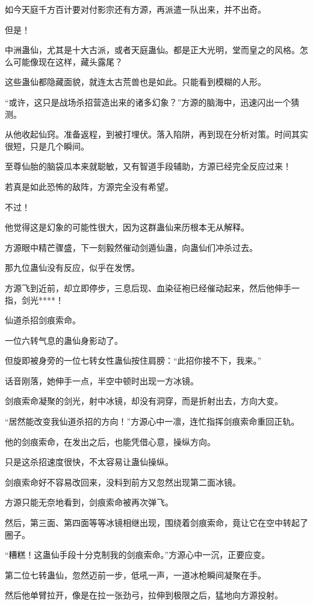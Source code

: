 \begin{this_body}
如今天庭千方百计要对付影宗还有方源，再派遣一队出来，并不出奇。

但是！

中洲蛊仙，尤其是十大古派，或者天庭蛊仙。都是正大光明，堂而皇之的风格。怎么可能像现在这样，藏头露尾？

这些蛊仙都隐藏面貌，就连太古荒兽也是如此。只能看到模糊的人形。

“或许，这只是战场杀招营造出来的诸多幻象？”方源的脑海中，迅速闪出一个猜测。

从他收起仙窍。准备返程，到被打埋伏。落入陷阱，再到现在分析对策。时间其实很短，只是几个瞬间。

至尊仙胎的脑袋瓜本来就聪敏，又有智道手段辅助，方源已经完全反应过来！

若真是如此恐怖的敌阵，方源完全没有希望。

不过！

他觉得这是幻象的可能性很大，因为这群蛊仙来历根本无从解释。

方源眼中精芒骤盛，下一刻毅然催动剑遁仙蛊，向蛊仙们冲杀过去。

那九位蛊仙没有反应，似乎在发愣。

方源飞到近前，却立即停步，三息后现、血染征袍已经催动起来，然后他伸手一指，剑光****！

仙道杀招剑痕索命。

一位六转气息的蛊仙身影动了。

但旋即被身旁的一位七转女性蛊仙按住肩膀：“此招你接不下，我来。”

话音刚落，她伸手一点，半空中顿时出现一方冰镜。

剑痕索命凝聚的剑光，射中冰镜，却没有洞穿，而是折射出去，方向大变。

“居然能改变我仙道杀招的方向！”方源心中一凛，连忙指挥剑痕索命重回正轨。

他的剑痕索命，在发出之后，也能凭借心意，操纵方向。

只是这杀招速度很快，不太容易让蛊仙操纵。

剑痕索命好不容易改回来，没料到前方又忽然出现第二面冰镜。

方源只能无奈地看到，剑痕索命被再次弹飞。

然后，第三面、第四面等等冰镜相继出现，围绕着剑痕索命，竟让它在空中转起了圈子。

“糟糕！这蛊仙手段十分克制我的剑痕索命。”方源心中一沉，正要应变。

第二位七转蛊仙，忽然迈前一步，低吼一声，一道冰枪瞬间凝聚在手。

然后他单臂拉开，像是在拉一张劲弓，拉伸到极限之后，猛地向方源投射。


\end{this_body}

